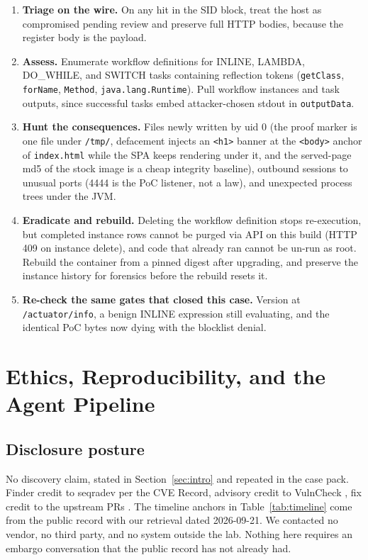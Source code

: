 \documentclass[journal]{IEEEtran}
\begin{document}
\begin{enumerate}
\item \textbf{Triage on the wire.} On any hit in the SID block, treat the
host as compromised pending review and preserve full HTTP bodies, because the
register body is the payload.
\item \textbf{Assess.} Enumerate workflow definitions for INLINE, LAMBDA,
DO\_WHILE, and SWITCH tasks containing reflection tokens (\texttt{getClass},
\texttt{forName}, \texttt{Method}, \texttt{java.lang.Runtime}). Pull workflow
instances and task outputs, since successful tasks embed attacker-chosen
stdout in \texttt{outputData}.
\item \textbf{Hunt the consequences.} Files newly written by uid 0 (the proof
marker is one file under \texttt{/tmp/}, defacement injects an
\texttt{\textless h1\textgreater} banner at the
\texttt{\textless body\textgreater{}} anchor of \texttt{index.html} while the
SPA keeps rendering under it, and the served-page md5 of the stock image is a
cheap integrity baseline), outbound sessions to unusual ports (4444 is the PoC
listener, not a law), and unexpected process trees under the JVM.
\item \textbf{Eradicate and rebuild.} Deleting the workflow definition stops
re-execution, but completed instance rows cannot be purged via API on this
build (HTTP 409 on instance delete), and code that already ran cannot be
un-run as root. Rebuild the container from a pinned digest after upgrading,
and preserve the instance history for forensics before the rebuild resets it.
\item \textbf{Re-check the same gates that closed this case.} Version at
\texttt{/actuator/info}, a benign INLINE expression still evaluating, and the
identical PoC bytes now dying with the blocklist denial.
\end{enumerate}

\section{Ethics, Reproducibility, and the Agent Pipeline}
\label{sec:ethics}

\subsection{Disclosure posture}

No discovery claim, stated in Section~\ref{sec:intro} and repeated in the case
pack. Finder credit to seqradev per the CVE Record, advisory credit to
VulnCheck \cite{vulncheck}, fix credit to the upstream PRs
\cite{fixcommits}. The timeline anchors in Table~\ref{tab:timeline} come from
the public record with our retrieval dated 2026-09-21. We contacted no vendor,
no third party, and no system outside the lab. Nothing here requires an
embargo conversation that the public record has not already had.
\end{document}
